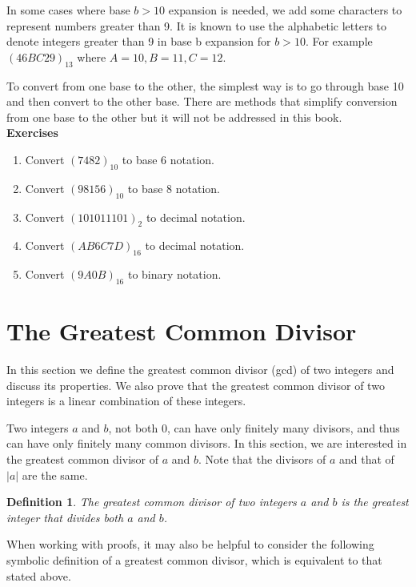\documentclass[12pt,letterpaper]{book}
\newtheorem{definition}{Definition}
\begin{document}
In some cases where base $b>10$ expansion is needed, we
add some characters to represent numbers greater than 9.  It is
known to use the alphabetic letters to denote integers greater than
9 in base b expansion for $b>10$. For example $(46BC29)_{13}$ where
$A=10, B=11, C=12$.
\par To convert from one base to the other, the simplest way is to
go through base 10 and then convert to the other base.  There are
methods that simplify conversion from one base to the other but it
will not be addressed in this book.\\

\textbf{Exercises}
\begin{enumerate}
\item{Convert $(7482)_{10}$ to base 6 notation.} \item{Convert
$(98156)_{10}$ to base 8 notation.}\item{Convert $(101011101)_2$ to
decimal notation.}\item{Convert $(AB6C7D)_{16}$ to decimal
notation.}\item{Convert $(9A0B)_{16}$ to binary notation.}
\end{enumerate}

\newpage


\section{The Greatest Common Divisor}
\par  In this section we define the greatest
common divisor (gcd)  of two integers
and discuss its properties. We also prove that the greatest common
divisor of two integers is a linear combination of these integers.

Two integers $a$ and $b$, not both $0$, can have only finitely many
divisors, and thus can have only finitely many common divisors. In
this section, we are interested in the greatest common divisor of
$a$ and $b$. Note that the divisors of $a$ and that of $|a|$ are the same.

\begin{definition}
The greatest common divisor of two integers $a$ and $b$ is the
greatest integer that divides both $a$ and $b$.
\end{definition}

When working with proofs, it may also be helpful to consider the following symbolic definition of a greatest common divisor, which is equivalent to that stated above.
\end{document}
